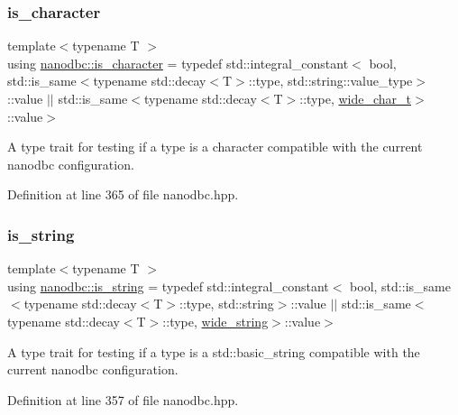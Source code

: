 \mbox{\label{group__utility_gadf207d0dda8d44076925a9d19fbfac0a}} 
\subsubsection{\texorpdfstring{is\_character}{is\_character}}
{\footnotesize\ttfamily template$<$typename T $>$ \\
using \mbox{\hyperlink{group__utility_gadf207d0dda8d44076925a9d19fbfac0a}{nanodbc\+::is\+\_\+character}} = typedef std\+::integral\+\_\+constant$<$ bool, std\+::is\+\_\+same$<$typename std\+::decay$<$T$>$\+::type, std\+::string\+::value\+\_\+type$>$\+::value $\vert$$\vert$ std\+::is\+\_\+same$<$typename std\+::decay$<$T$>$\+::type, \mbox{\hyperlink{namespacenanodbc_ad2d466f268b27c7f76a801379dbeb101}{wide\+\_\+char\+\_\+t}}$>$\+::value$>$}



A type trait for testing if a type is a character compatible with the current nanodbc configuration. 



Definition at line 365 of file nanodbc.\+hpp.

\mbox{\label{group__utility_gaac06d237b348a3040a5cb378e86af570}} 
\subsubsection{\texorpdfstring{is\_string}{is\_string}}
{\footnotesize\ttfamily template$<$typename T $>$ \\
using \mbox{\hyperlink{group__utility_gaac06d237b348a3040a5cb378e86af570}{nanodbc\+::is\+\_\+string}} = typedef std\+::integral\+\_\+constant$<$ bool, std\+::is\+\_\+same$<$typename std\+::decay$<$T$>$\+::type, std\+::string$>$\+::value $\vert$$\vert$ std\+::is\+\_\+same$<$typename std\+::decay$<$T$>$\+::type, \mbox{\hyperlink{namespacenanodbc_aeddf33f0df2bb9ba05323112e3aed316}{wide\+\_\+string}}$>$\+::value$>$}



A type trait for testing if a type is a std\+::basic\+\_\+string compatible with the current nanodbc configuration. 



Definition at line 357 of file nanodbc.\+hpp.

